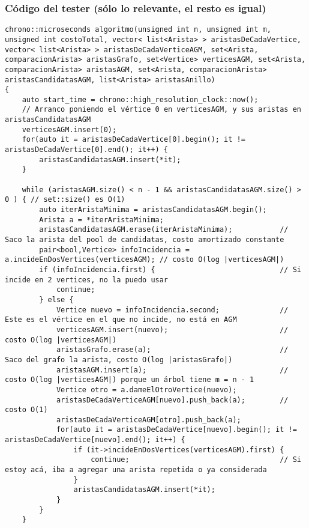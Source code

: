 \subsubsection{Código del tester (sólo lo relevante, el resto es igual)}
\begin{lstlisting}[frame=single]
chrono::microseconds algoritmo(unsigned int n, unsigned int m, unsigned int costoTotal, vector< list<Arista> > aristasDeCadaVertice, vector< list<Arista> > aristasDeCadaVerticeAGM, set<Arista, comparacionArista> aristasGrafo, set<Vertice> verticesAGM, set<Arista, comparacionArista> aristasAGM, set<Arista, comparacionArista> aristasCandidatasAGM, list<Arista> aristasAnillo) 
{
    auto start_time = chrono::high_resolution_clock::now();
    // Arranco poniendo el vértice 0 en verticesAGM, y sus aristas en aristasCandidatasAGM
    verticesAGM.insert(0);
    for(auto it = aristasDeCadaVertice[0].begin(); it != aristasDeCadaVertice[0].end(); it++) {
        aristasCandidatasAGM.insert(*it);
    }
    
    while (aristasAGM.size() < n - 1 && aristasCandidatasAGM.size() > 0 ) { // set::size() es O(1)
        auto iterAristaMinima = aristasCandidatasAGM.begin();
        Arista a = *iterAristaMinima;
        aristasCandidatasAGM.erase(iterAristaMinima);           // Saco la arista del pool de candidatas, costo amortizado constante
        pair<bool,Vertice> infoIncidencia = a.incideEnDosVertices(verticesAGM); // costo O(log |verticesAGM|)
        if (infoIncidencia.first) {                             // Si incide en 2 vertices, no la puedo usar
            continue;
        } else {
            Vertice nuevo = infoIncidencia.second;              // Este es el vértice en el que no incide, no está en AGM
            verticesAGM.insert(nuevo);                          // costo O(log |verticesAGM|)
            aristasGrafo.erase(a);                              // Saco del grafo la arista, costo O(log |aristasGrafo|)
            aristasAGM.insert(a);                               // costo O(log |verticesAGM|) porque un árbol tiene m = n - 1
            Vertice otro = a.dameElOtroVertice(nuevo);
            aristasDeCadaVerticeAGM[nuevo].push_back(a);        // costo O(1)
            aristasDeCadaVerticeAGM[otro].push_back(a);
            for(auto it = aristasDeCadaVertice[nuevo].begin(); it != aristasDeCadaVertice[nuevo].end(); it++) {
                if (it->incideEnDosVertices(verticesAGM).first) {
                    continue;                                   // Si estoy acá, iba a agregar una arista repetida o ya considerada
                }
                aristasCandidatasAGM.insert(*it);
            }
        }
    }
    

\end{lstlisting}

